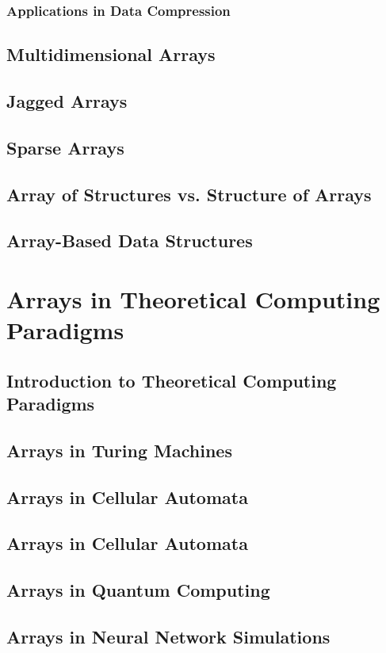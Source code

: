 \documentclass[12pt, oneside]{book}
\begin{document}
	\subsection{Applications in Data Compression}
	\section{Multidimensional Arrays}
	\section{Jagged Arrays}
	\section{Sparse Arrays}
	\section{Array of Structures vs. Structure of Arrays}
	\section{Array-Based Data Structures}

\chapter{Arrays in Theoretical Computing Paradigms}

\section{Introduction to Theoretical Computing Paradigms}
\section{Arrays in Turing Machines}
\section{Arrays in Cellular Automata}
\section{Arrays in Cellular Automata}
\section{Arrays in Quantum Computing}
\section{Arrays in Neural Network Simulations}
\end{document}
